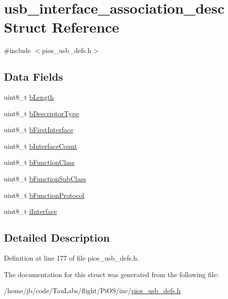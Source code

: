 \hypertarget{structusb__interface__association__desc}{\section{usb\-\_\-interface\-\_\-association\-\_\-desc \-Struct \-Reference}
\label{structusb__interface__association__desc}
}


{\ttfamily \#include $<$pios\-\_\-usb\-\_\-defs.\-h$>$}

\subsection*{\-Data \-Fields}
\begin{DoxyCompactItemize}
\item 
uint8\-\_\-t \hyperlink{group___p_i_o_s___u_s_b___d_e_f_s_gac2df51916afa2daee6b2cd5084aa9b65}{b\-Length}
\item 
uint8\-\_\-t \hyperlink{group___p_i_o_s___u_s_b___d_e_f_s_gab9d86ba47450d51a49e1b25684970e4e}{b\-Descriptor\-Type}
\item 
uint8\-\_\-t \hyperlink{group___p_i_o_s___u_s_b___d_e_f_s_ga5301f325d65bec1bea2bf370c1a753ea}{b\-First\-Interface}
\item 
uint8\-\_\-t \hyperlink{group___p_i_o_s___u_s_b___d_e_f_s_gae55742862ae442a25fc810abbfae15ef}{b\-Interface\-Count}
\item 
uint8\-\_\-t \hyperlink{group___p_i_o_s___u_s_b___d_e_f_s_ga29a82765e766cecea56a883db16dd78e}{b\-Function\-Class}
\item 
uint8\-\_\-t \hyperlink{group___p_i_o_s___u_s_b___d_e_f_s_ga8bd62c9bba867dfd7abbba86be72499f}{b\-Function\-Sub\-Class}
\item 
uint8\-\_\-t \hyperlink{group___p_i_o_s___u_s_b___d_e_f_s_gae62dbcef82dd75a085f93d53a9c3e515}{b\-Function\-Protocol}
\item 
uint8\-\_\-t \hyperlink{group___p_i_o_s___u_s_b___d_e_f_s_gaa00aa6d432539190581b46990ad5cdf5}{i\-Interface}
\end{DoxyCompactItemize}


\subsection{\-Detailed \-Description}


\-Definition at line 177 of file pios\-\_\-usb\-\_\-defs.\-h.



\-The documentation for this struct was generated from the following file\-:\begin{DoxyCompactItemize}
\item 
/home/jb/code/\-Tau\-Labs/flight/\-Pi\-O\-S/inc/\hyperlink{pios__usb__defs_8h}{pios\-\_\-usb\-\_\-defs.\-h}\end{DoxyCompactItemize}
